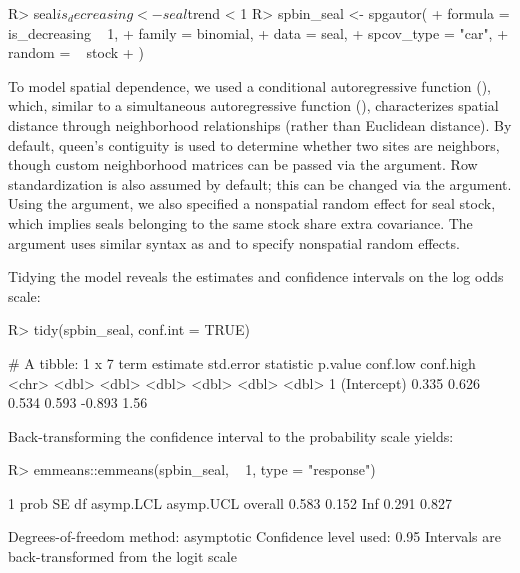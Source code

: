 \documentclass[
]{jss}
\begin{document}
\begin{CodeChunk}
\begin{CodeInput}
R> seal$is_decreasing <- seal$trend < 1
R> spbin_seal <- spgautor(
+    formula = is_decreasing ~ 1,
+    family = binomial,
+    data = seal,
+    spcov_type = "car",
+    random = ~ stock
+  )
\end{CodeInput}
\end{CodeChunk}

To model spatial dependence, we used a conditional autoregressive
function (), which, similar to a simultaneous
autoregressive function (), characterizes
spatial distance through neighborhood relationships (rather than
Euclidean distance). By default, queen's contiguity is used to determine
whether two sites are neighbors, though custom neighborhood matrices can
be passed via the  argument. Row standardization is also assumed
by default; this can be changed via the  argument. Using
the  argument, we also specified a nonspatial random effect
for seal stock, which implies seals belonging to the same stock share
extra covariance. The  argument uses similar syntax as
 \citep{bates2015lme4} and 
\citep{pinheiro2006mixed} to specify nonspatial random effects.

Tidying the model reveals the estimates and confidence intervals on the
log odds scale:

\begin{CodeChunk}
\begin{CodeInput}
R> tidy(spbin_seal, conf.int = TRUE)
\end{CodeInput}
\begin{CodeOutput}
# A tibble: 1 x 7
  term        estimate std.error statistic p.value conf.low conf.high
  <chr>          <dbl>     <dbl>     <dbl>   <dbl>    <dbl>     <dbl>
1 (Intercept)    0.335     0.626     0.534   0.593   -0.893      1.56
\end{CodeOutput}
\end{CodeChunk}

Back-transforming the confidence interval to the probability scale
yields:

\begin{CodeChunk}
\begin{CodeInput}
R> emmeans::emmeans(spbin_seal, ~ 1, type = "response")
\end{CodeInput}
\begin{CodeOutput}
 1        prob    SE  df asymp.LCL asymp.UCL
 overall 0.583 0.152 Inf     0.291     0.827

Degrees-of-freedom method: asymptotic 
Confidence level used: 0.95 
Intervals are back-transformed from the logit scale 
\end{CodeOutput}
\end{CodeChunk}
\end{document}
